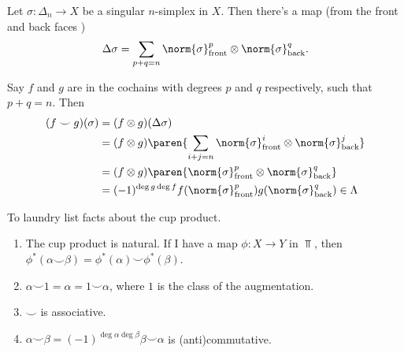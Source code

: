 \begin{defn}
    Let $\sigma \colon \Delta_n \to X$ be a singular $n$-simplex in $X$. Then there's a map (from the front and back faces \TODO)
   \[
       \Delta \sigma  = \sum_{p + q = n} \norm{ \sigma }_\text{front}^p \otimes \norm{ \sigma }_\text{back}^q
   .\]
\end{defn}

Say $f$ and $g$ are in the cochains with degrees $p$ and $q$ respectively, such that $p+q = n$. Then
\begin{align*}
    (f \smile g)(\sigma) &= (f \otimes g)(\Delta\sigma)\\
                       &= (f \otimes g) \paren{\sum_{i+j = n} \norm{ \sigma }_\text{front}^i \otimes \norm{ \sigma }_\text{back}^j} \\
                       &= (f \otimes g) \paren{ \norm{ \sigma }_\text{front}^p \otimes \norm{ \sigma }_\text{back}^q}  \\
                       & = (-1)^{\deg g \deg f} f(  \norm{ \sigma }_\text{front}^p ) g(\norm{ \sigma }_\text{back}^q) \in \Lambda
\end{align*}

To laundry list facts about the cup product.
\begin{enumerate}
    \item The cup product is natural. If I have a map $\phi \colon X \to Y$ in $\Top$, then $\phi^*(\alpha \smile \beta) = \phi^*(\alpha) \smile \phi^*(\beta)$.
    \item $\alpha \smile 1 = \alpha = 1 \smile \alpha$, where $1$ is the class of the augmentation.
    \item $\smile$ is associative.
    \item $\alpha \smile \beta = (-1)^{\deg \alpha \deg \beta} \beta \smile \alpha$ is (anti)commutative.
\end{enumerate}
 
